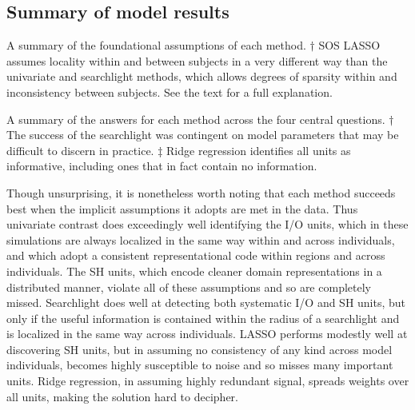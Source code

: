 \subsection{Summary of model results}
\begin{sidewaystable}

\caption{A summary of the foundational assumptions of each method.  $\dagger$ SOS LASSO assumes locality within and between subjects in a very different way than the univariate and searchlight methods, which allows degrees of sparsity within and inconsistency between subjects. See the text for a full explanation.}
\label{tab.assumptions}
\end{sidewaystable}

\begin{table}

\caption{A summary of the answers for each method across the four central questions. $\dagger$ The success of the searchlight was contingent on model parameters that may be difficult to discern in practice. $\ddagger$ Ridge regression identifies all units as informative, including ones that in fact contain no information.} 
\label{tab.modelresults}
\end{table}

Though unsurprising, it is nonetheless worth noting that each method succeeds best when the implicit assumptions it adopts are met in the data. Thus univariate contrast does exceedingly well identifying the I/O units, which in these simulations are always localized in the same way within and across individuals, and which adopt a consistent representational code within regions and across individuals. The SH units, which encode cleaner domain representations in a distributed manner, violate all of these assumptions and so are completely missed. Searchlight does well at detecting both systematic I/O and SH units, but only if the useful information is contained within the radius of a searchlight and is localized in the same way across individuals. LASSO performs modestly well at discovering SH units, but in assuming no consistency of any kind across model individuals, becomes highly susceptible to noise and so misses many important units. Ridge regression, in assuming highly redundant signal, spreads weights over all units, making the solution hard to decipher.

